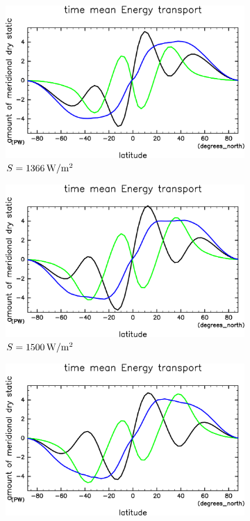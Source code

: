 \documentclass[body]{subfiles}
\begin{document}
\begin{figure}[t]
	\centering
	\begin{subfigure}{.4\textwidth}
		\centering
		\includegraphics[width=\columnwidth]{S1366/EngyFlx,time=14600:14965-crop-rotate.pdf}
		\caption{\(S=1366\hmu{W/m^2}\)}
	\end{subfigure}
	\begin{subfigure}{.4\textwidth}
		\centering
		\includegraphics[width=\columnwidth]{S1500/EngyFlx,time=3650:4015-crop-rotate.pdf}
		\caption{\(S=1500\hmu{W/m^2}\)}
	\end{subfigure}
	\begin{subfigure}{.4\textwidth}
		\centering
		\includegraphics[width=\columnwidth]{S1600/EngyFlx,time=3650:4015-crop-rotate.pdf}

\end{subfigure}
\end{figure}
\end{document}
